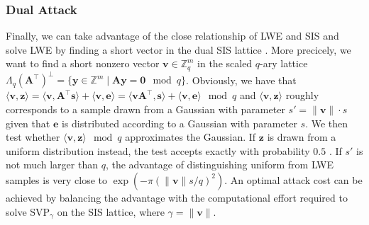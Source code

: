 \subsubsection{Dual Attack}\label{sec:dual-attacks}
Finally, we can take advantage of the close relationship of LWE and SIS and solve LWE by finding a short vector in the dual SIS lattice \cite{LP11}. More precicely, we want to find a short nonzero vector $\mathbf{v}\in \mathbb{Z}_q^{m}$ in the scaled $q$-ary lattice $\Lambda_q(\mathbf{A}^\intercal)^{\perp} = \{ \mathbf{y} \in \mathbb{Z}^m \mid \mathbf{A} \mathbf{y} = \mathbf{0} \mod q\}$. Obviously, we have that $\langle \mathbf{v}, \mathbf{z} \rangle = \langle \mathbf{v}, \mathbf{A}^\intercal \mathbf{s} \rangle + \langle \mathbf{v}, \mathbf{e}\rangle = \langle \mathbf{v}\mathbf{A}^\intercal,  \mathbf{s} \rangle + \langle \mathbf{v}, \mathbf{e} \rangle \mod q$ and $\langle \mathbf{v}, \mathbf{z} \rangle$ roughly corresponds to a sample drawn from a Gaussian with parameter $s' = \|\mathbf{v}\| \cdot s$ given that $\mathbf{e}$ is distributed according to a Gaussian with parameter $s$. We then test whether $\langle \mathbf{v}, \mathbf{z} \rangle \mod q$ approximates the Gaussian. If $\mathbf{z}$ is drawn from a uniform distribution instead, the test accepts exactly with probability $0.5$ \cite{LP11}. If $s'$ is not much larger than $q$, the advantage of distinguishing uniform from LWE samples is very close to $\exp(-\pi (\| \mathbf{v} \| s/q)^2)$. An optimal attack cost can be achieved by balancing the advantage with the computational effort required to solve SVP$_\gamma$ on the SIS lattice, where $\gamma = \|\mathbf{v}\|$.












